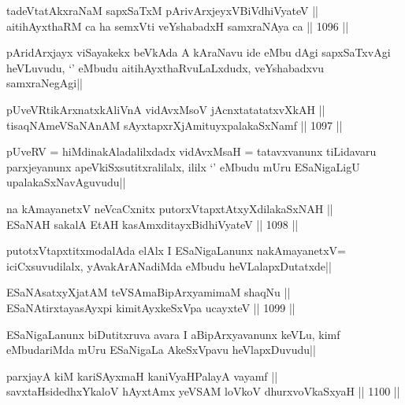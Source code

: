 \begin{shl}
tadeVtatAkxraNaM sapxSaTxM pArivArxjeyxV\s BiVdhiVyateV || \\
aitihAyxthaRM ca ha semxVti veYshabadxH samxraNAya ca ||  1096 ||  
\end{shl}

\begin{artha}
pAridArxjayx viSayakekx beVkAda A kAraNavu ide eMbu dAgi sapxSaTxvAgi heVLuvudu, `\stext' eMbudu aitihAyxthaRvuLaLxdudx, veYshabadxvu samxraNegAgi||
\end{artha}

\begin{shl}
pUveVR\s tikArxnatxkAliVnA vidAvxMsoV jAcnxtatatatxvXkAH || \\
tisaqNAmeVSaNAnAM sAyxtapxrXjAmituyxpalakaSxNamf ||  1097 ||  
\end{shl}

\begin{artha}
pUveRV = hiMdinakAladalilxdadx vidAvxMsaH = tatavxvanunx tiLidavaru parxjeyanunx apeVkiSxsutitxralilalx, ililx `\stext' eMbudu mUru ESaNigaLigU upalakaSxNavAguvudu||
\end{artha}

\begin{shl}
na kAmayanetxV neVcaCxnitx putorxVtapxtAtxyXdilakaSxNAH || \\
ESaNAH sakalA EtAH kasAmxditayxBidhiVyateV ||  1098 ||  
\end{shl}

\begin{artha}
putotxVtapxtitxmodalAda elAlx I ESaNigaLanunx nakAmayanetxV= iciCxsuvudilalx, yAvakArANadiMda eMbudu heVLalapxDutatxde||
\end{artha}

\begin{shl}
ESaNAsatxyXjatAM teVSAmaBipArxyamimaM shaqNu ||  \\
ESaNAtirxtayasAyxpi kimitAyxkeSxVpa ucayxteV ||  1099 ||  
\end{shl}

\begin{artha}
ESaNigaLanunx biDutitxruva avara I aBipArxyavanunx keVLu, kimf  eMbudariMda mUru ESaNigaLa AkeSxVpavu heVlapxDuvudu||
\end{artha}

\begin{shl}
parxjayA kiM kariSAyxmaH kaniVyaHPalayA vayamf || \\
savxtaHsidedhxYkaloV hAyxtAmx yeVSAM loVkoV dhurxvoV\s kaSxyaH ||  1100 ||  
\end{shl}

